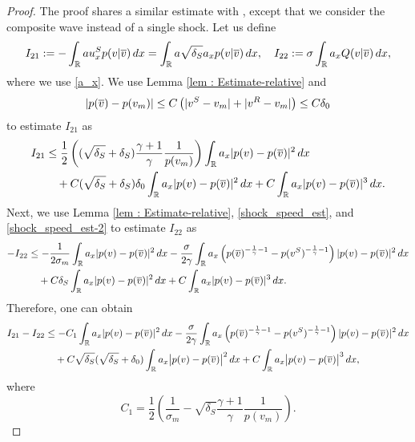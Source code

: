 \documentclass[11pt,reqno]{amsart}
\begin{document}
\begin{proof}
    The proof shares a similar estimate with \cite[Lemma 4.3]{HKKL_pre}, except that we consider the composite wave instead of a single shock. Let us define
    \begin{align*}
        I_{21}:=-\int_{\mathbb{R}} a u^S_x p(v|\overline{v}) \, dx =\int_{\mathbb{R}}  a \sqrt{\delta_S} a_x p(v | \overline{v}) \,dx, \quad I_{22}:=\sigma \int_{\mathbb{R}} a_x Q(v|\overline{v}) \, dx,
    \end{align*}
	where we use \eqref{a_x}. We use Lemma \ref{lem : Estimate-relative} and 
    \[|p(\overline{v})-p(v_m)| \le C \left( |v^S-v_m| + |v^R-v_m|\right) \le C \delta_0 \] 
    to estimate $I_{21}$ as
    \begin{align*}
        I_{21} &\le \frac{1}{2} \left( (\sqrt{\delta_S}+\delta_S)  \frac{\gamma+1}{ \gamma } \frac{1}{p(v_m)} \right) \int_\mathbb{R} a_x  |p(v)-p(\overline{v})|^2 \, dx \\
         &\quad +C (\sqrt{\delta_S}+\delta_S) \delta_0 \int_\mathbb{R}a_x |p(v)-p(\overline{v})|^2 \, dx +C \int_\mathbb{R} a_x |p(v)-p(\overline{v})|^3 \, dx.
    \end{align*}
    Next, we use Lemma \ref{lem : Estimate-relative}, \eqref{shock_speed_est}, and \eqref{shock_speed_est-2} to estimate $I_{22}$ as
        \begin{align*}
        -I_{22} &\le -\frac{1}{2 \sigma_m}  \int_\mathbb{R} a_x |p(v)-p(\overline{v})|^2 \, dx - \frac{\sigma}{2\gamma}\int_\mathbb{R} a_x \left( p(\overline{v})^{-\frac{1}{\gamma}-1} -p(v^S)^{-\frac{1}{\gamma}-1} \right) |p(v)-p(\overline{v})|^2\, dx \\ 
        &\quad + C \delta_S \int_\mathbb{R} a_x |p(v)-p(\overline{v})|^2 \, dx + C \int_\mathbb{R} a_x |p(v)-p(\overline{v})|^3 \, dx.
        \end{align*}
        Therefore, one can obtain
        \begin{align*}
        \begin{aligned} %
        I_{21} -I_{22} 
        &\le - C_1  \int_\R a_x |p(v)-p(\ov)|^2 \, d x  - \frac{\sigma}{2\gamma}\int_\mathbb{R} a_x \left( p(\ov)^{-\frac{1}{\gamma}-1} -p(\vs)^{-\frac{1}{\gamma}-1} \right) |p(v)-p(\ov)|^2\, dx \\ 
        &\quad +C\sqrt{\delta_S}(\sqrt{\delta_S}+\delta_0) \int_\R a_x\big|p(v)-p(\ov)\big|^2 \, d x+C\int_\R a_x\big|p(v)-p(\ov)\big|^3 \, d x,
        \end{aligned}
        \end{align*}
        where
        \begin{equation}\label{C_star}
        C_1 = \frac{1}{2}\left(\frac{1}{\sigma_m}-\sqrt{\delta_S}\frac{\gamma+1}{\gamma}\frac{1}{p(v_m)}\right).
        \end{equation}
    \end{proof}
\end{document}
